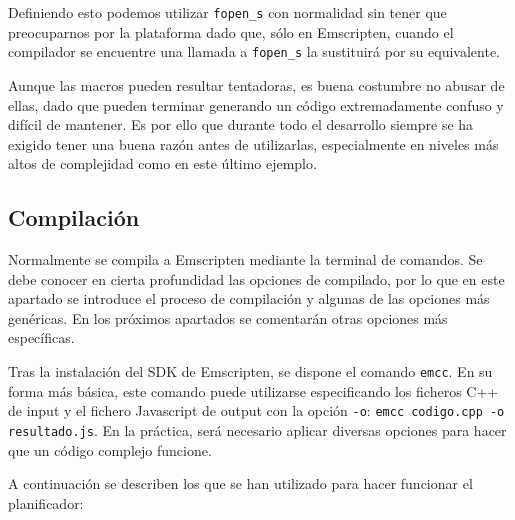 Definiendo esto podemos utilizar \texttt{fopen\_s} con normalidad sin tener que preocuparnos por la plataforma dado que, sólo en Emscripten, cuando el compilador se encuentre una llamada a \texttt{fopen\_s} la sustituirá por su equivalente.

Aunque las macros pueden resultar tentadoras, es buena costumbre no abusar de ellas, dado que pueden terminar generando un código extremadamente confuso y difícil de mantener. Es por ello que durante todo el desarrollo siempre se ha exigido tener una buena razón antes de utilizarlas, especialmente en niveles más altos de complejidad como en este último ejemplo.


\subsection{Compilación}
Normalmente se compila a Emscripten mediante la terminal de comandos. Se debe conocer en cierta profundidad las opciones de compilado, por lo que en este apartado se introduce el proceso de compilación y algunas de las opciones más genéricas. En los próximos apartados se comentarán otras opciones más específicas.

Tras la instalación del SDK de Emscripten, se dispone el comando \texttt{emcc}. En su forma más básica, este comando puede utilizarse especificando los ficheros C++ de input y el fichero Javascript de output con la opción \texttt{-o}: \texttt{emcc codigo.cpp -o resultado.js}. En la práctica, será necesario aplicar diversas opciones para hacer que un código complejo funcione.

A continuación se describen los que se han utilizado para hacer funcionar el planificador:

